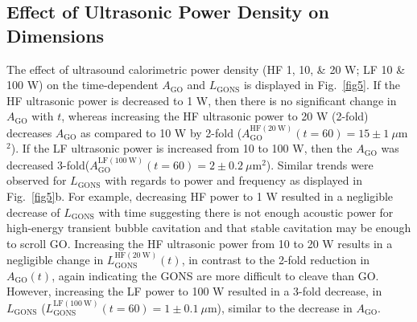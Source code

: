 \subsection{Effect of Ultrasonic Power Density on Dimensions}
The effect of ultrasound calorimetric power density (HF 1, 10, \& 20 W; LF 10 \& 100 W) on the time-dependent $A_{\mathrm{GO}}$ and $L_{\mathrm{GONS}}$ is displayed in Fig.~\ref{fig5}. If the HF ultrasonic power is decreased to 1 W, then there is no significant change in $A_{\mathrm{GO}}$ with $t$, whereas increasing the HF ultrasonic power to 20 W (2-fold) decreases $A_{\mathrm{GO}}$ as compared to 10 W by 2-fold ($A_{\mathrm{GO}}^{\mathrm{HF(20\ \mathrm{W})}}(t = 60) = 15 \pm 1\ \mu$m$^{2}$). If the LF ultrasonic power is increased from 10 to 100 W, then the $A_{\mathrm{GO}}$ was decreased 3-fold($A_{\mathrm{GO}}^{\mathrm{LF(100\ \mathrm{W})}}(t = 60) = 2 \pm 0.2\ \mu$m$^{2}$). Similar trends were observed for $L_{\mathrm{GONS}}$ with regards to power and frequency as displayed in Fig.~\ref{fig5}b. For example, decreasing HF power to 1 W resulted in a negligible decrease of $L_{\mathrm{GONS}}$ with time suggesting there is not enough acoustic power for high-energy transient bubble cavitation and that stable cavitation may be enough to scroll GO. Increasing the HF ultrasonic power from 10 to 20 W results in a negligible change in $L_{\mathrm{GONS}}^{\mathrm{HF(20\ \mathrm{W})}}(t)$, in contrast to the 2-fold reduction in $A_{\mathrm{GO}}(t)$, again indicating the GONS are more difficult to cleave than GO. However, increasing the LF power to 100 W resulted in a 3-fold decrease, in $L_{\mathrm{GONS}}$ ($L_{\mathrm{GONS}}^{\mathrm{LF(100\ \mathrm{W})}}(t = 60) = 1 \pm 0.1\ \mu$m), similar to the decrease in $A_{\mathrm{GO}}$.

